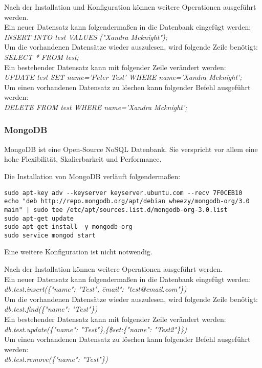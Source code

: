 Nach der Installation und Konfiguration können weitere Operationen ausgeführt werden.\\
Ein neuer Datensatz kann folgendermaßen in die Datenbank eingefügt werden:\\
\textit{INSERT INTO test VALUES ("Xandra Mcknight");}\\
Um die vorhandenen Datensätze wieder auszulesen, wird folgende Zeile benötigt:\\
\textit{SELECT * FROM test;}\\
Ein bestehender Datensatz kann mit folgender Zeile verändert werden:\\
\textit{UPDATE test SET name='Peter Test' WHERE name='Xandra Mcknight';}\\
Um einen vorhandenen Datensatz zu löschen kann folgender Befehl ausgeführt werden:\\
\textit{DELETE FROM test WHERE name='Xandra Mcknight';}

\subsubsection{MongoDB}
MongoDB ist eine Open-Source NoSQL Datenbank. Sie verspricht vor allem eine hohe Flexibilität, Skalierbarkeit und Performance. \cite{ABOUTMONGODB}

Die Installation von MongoDB verläuft folgendermaßen:
\begin{lstlisting}[caption=Installation von MongoDB \cite{MONGODBINSTALL}]
sudo apt-key adv --keyserver keyserver.ubuntu.com --recv 7F0CEB10
echo "deb http://repo.mongodb.org/apt/debian wheezy/mongodb-org/3.0 main" | sudo tee /etc/apt/sources.list.d/mongodb-org-3.0.list
sudo apt-get update
sudo apt-get install -y mongodb-org
sudo service mongod start
\end{lstlisting}
Eine weitere Konfiguration ist nicht notwendig.

Nach der Installation können weitere Operationen ausgeführt werden.\\
Ein neuer Datensatz kann folgendermaßen in die Datenbank eingefügt werden:\\
\textit{db.test.insert(\{"name": "Test", \"email": "test@email.com"\})}\\
Um die vorhandenen Datensätze wieder auszulesen, wird folgende Zeile benötigt:\\
\textit{db.test.find(\{"name": "Test"\})}\\
Ein bestehender Datensatz kann mit folgender Zeile verändert werden:\\
\textit{db.test.update(\{"name": "Test"\},\{\$set:\{"name": "Test2"\}\})}\\
Um einen vorhandenen Datensatz zu löschen kann folgender Befehl ausgeführt werden:\\
\textit{db.test.remove(\{"name": "Test"\})}

